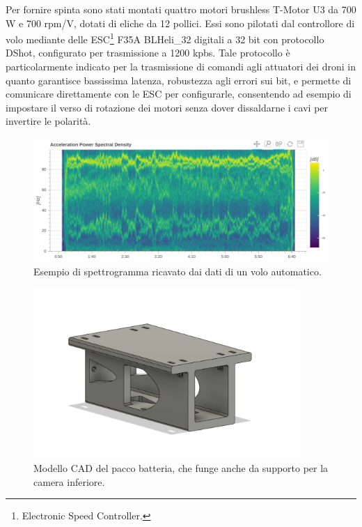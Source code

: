Per fornire spinta sono stati montati quattro motori brushless T-Motor U3 da 700 W e 700 rpm/V, dotati di eliche da 12 pollici. Essi sono pilotati dal controllore di volo mediante delle ESC\footnote{Electronic Speed Controller.} F35A BLHeli\_32 digitali a 32 bit con protocollo DShot, configurato per trasmissione a 1200 kpbs. Tale protocollo è particolarmente indicato per la trasmissione di comandi agli attuatori dei droni in quanto garantisce bassissima latenza, robustezza agli errori sui bit, e permette di comunicare direttamente con le ESC per configurarle, consentendo ad esempio di impostare il verso di rotazione dei motori senza dover dissaldarne i cavi per invertire le polarità.

\begin{figure}
    \centering
    \includegraphics[width=\textwidth]{figs/chapter3/flight_spectro.png}
    \caption{Esempio di spettrogramma ricavato dai dati di un volo automatico.}
    \label{fig:flightspec}
\end{figure}

\begin{figure}
    \centering
    \includegraphics[width=0.9\textwidth]{figs/chapter3/battery-pack.png}
    \caption{Modello CAD del pacco batteria, che funge anche da supporto per la camera inferiore.}
    \label{fig:batpack}
\end{figure}

